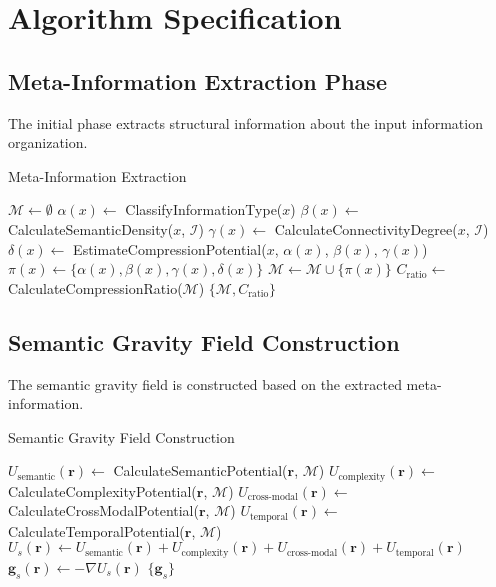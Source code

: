 \documentclass[12pt,a4paper]{article}
\begin{document}
\section{Algorithm Specification}

\subsection{Meta-Information Extraction Phase}

The initial phase extracts structural information about the input information organization.

\begin{algorithm}[H]
\caption{Meta-Information Extraction}
\begin{algorithmic}[1]
    \State $\mathcal{M} \leftarrow \emptyset$ 
        \State $\alpha(x) \leftarrow$ ClassifyInformationType($x$)
        \State $\beta(x) \leftarrow$ CalculateSemanticDensity($x$, $\mathcal{I}$)
        \State $\gamma(x) \leftarrow$ CalculateConnectivityDegree($x$, $\mathcal{I}$)
        \State $\delta(x) \leftarrow$ EstimateCompressionPotential($x$, $\alpha(x)$, $\beta(x)$, $\gamma(x)$)
        \State $\pi(x) \leftarrow \{\alpha(x), \beta(x), \gamma(x), \delta(x)\}$
        \State $\mathcal{M} \leftarrow \mathcal{M} \cup \{\pi(x)\}$
    \EndFor
    \State $C_{\text{ratio}} \leftarrow$ CalculateCompressionRatio($\mathcal{M}$)
    \State \Return $\{\mathcal{M}, C_{\text{ratio}}\}$
\EndProcedure
\end{algorithmic}
\end{algorithm}

\subsection{Semantic Gravity Field Construction}

The semantic gravity field is constructed based on the extracted meta-information.

\begin{algorithm}[H]
\caption{Semantic Gravity Field Construction}
\begin{algorithmic}[1]
        \State $U_{\text{semantic}}(\mathbf{r}) \leftarrow$ CalculateSemanticPotential($\mathbf{r}$, $\mathcal{M}$)
        \State $U_{\text{complexity}}(\mathbf{r}) \leftarrow$ CalculateComplexityPotential($\mathbf{r}$, $\mathcal{M}$)
        \State $U_{\text{cross-modal}}(\mathbf{r}) \leftarrow$ CalculateCrossModalPotential($\mathbf{r}$, $\mathcal{M}$)
        \State $U_{\text{temporal}}(\mathbf{r}) \leftarrow$ CalculateTemporalPotential($\mathbf{r}$, $\mathcal{M}$)
        \State $U_s(\mathbf{r}) \leftarrow U_{\text{semantic}}(\mathbf{r}) + U_{\text{complexity}}(\mathbf{r}) + U_{\text{cross-modal}}(\mathbf{r}) + U_{\text{temporal}}(\mathbf{r})$
        \State $\mathbf{g}_s(\mathbf{r}) \leftarrow -\nabla U_s(\mathbf{r})$
    \EndFor
    \State \Return $\{\mathbf{g}_s\}$
\EndProcedure
\end{algorithmic}
\end{algorithm}
\end{document}
